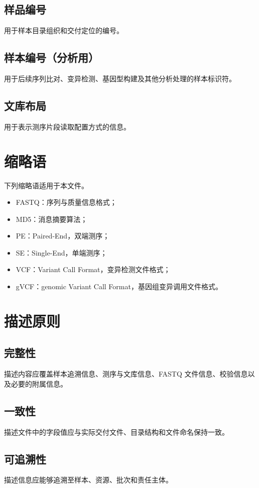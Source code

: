 \section{样品编号}
用于样本目录组织和交付定位的编号。

\section{样本编号（分析用）}
用于后续序列比对、变异检测、基因型构建及其他分析处理的样本标识符。

\section{文库布局}
用于表示测序片段读取配置方式的信息。

\chapter{缩略语}
下列缩略语适用于本文件。

\begin{itemize}
    \item FASTQ：序列与质量信息格式；
    \item MD5：消息摘要算法；
    \item PE：Paired-End，双端测序；
    \item SE：Single-End，单端测序；
    \item VCF：Variant Call Format，变异检测文件格式；
    \item gVCF：genomic Variant Call Format，基因组变异调用文件格式。
\end{itemize}

\chapter{描述原则}
\section{完整性}
描述内容应覆盖样本追溯信息、测序与文库信息、FASTQ 文件信息、校验信息以及必要的附属信息。

\section{一致性}
描述文件中的字段值应与实际交付文件、目录结构和文件命名保持一致。

\section{可追溯性}
描述信息应能够追溯至样本、资源、批次和责任主体。


